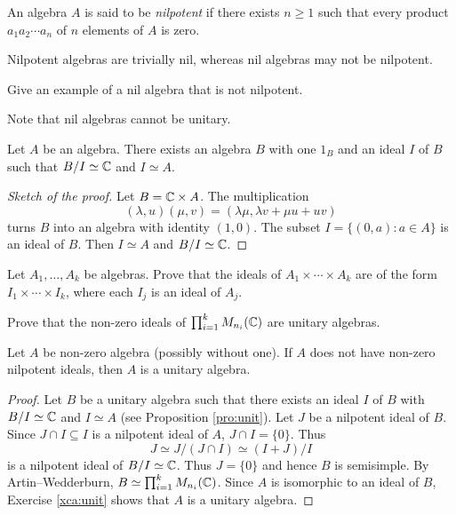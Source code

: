 \begin{definition}
    An algebra $A$ is said to be \emph{nilpotent} if there exists
    $n\geq1$ such that every product 
    $a_1a_2\cdots a_n$
    of $n$ elements of $A$ is zero. 
\end{definition}

Nilpotent algebras are trivially nil, whereas nil algebras may not be nilpotent.

\begin{exercise}
    Give an example of a nil algebra that is not nilpotent. 
\end{exercise}

Note that nil algebras cannot be unitary. 

\begin{proposition}
\label{pro:unit}
    Let $A$ be an algebra. There exists an algebra $B$ 
    with one $1_B$ and an ideal $I$ of $B$ 
    such that $B/I\simeq\mathbb{C}$ and $I\simeq A$. 
\end{proposition}

\begin{proof}[Sketch of the proof]
    Let $B=\mathbb{C}\times A$. The multiplication  
    \[
    (\lambda,u)(\mu,v)=(\lambda\mu,\lambda v+\mu u+uv)
    \]
    turns $B$ into an algebra with identity $(1,0)$. The subset
    $I=\{(0,a):a\in A\}$ is an ideal of $B$. Then $I\simeq A$ 
    and $B/I\simeq\mathbb{C}$. 
\end{proof}

\begin{exercise}
Let $A_1,\dots,A_k$ be algebras. 
Prove that the ideals of $A_1\times\cdots\times A_k$ 
are of the form $I_1\times\cdots\times I_k$, where
each $I_j$ is an ideal of $A_j$.  
\end{exercise}

\begin{exercise}
\label{xca:unit}
    Prove that the non-zero ideals of 
    $\prod_{i=1}^k M_{n_i}(\mathbb{C})$ are unitary algebras.  
\end{exercise}

\begin{proposition}
    Let $A$ be non-zero algebra (possibly without one). If $A$ 
    does not have non-zero nilpotent 
    ideals, then $A$ is a unitary algebra. 
\end{proposition}

\begin{proof}
    Let $B$ be a unitary algebra such that there exists
    an ideal $I$ of $B$ with $B/I\simeq\mathbb{C}$ and $I\simeq A$ 
    (see Proposition \ref{pro:unit}). Let $J$ be 
    a nilpotent ideal of $B$. Since $J\cap I\subseteq I$ is a nilpotent
    ideal of $A$, 
    $J\cap I=\{0\}$. Thus 
    \[
    J\simeq J/(J\cap I)\simeq (I+J)/I
    \]
    is a nilpotent ideal of $B/I\simeq\mathbb{C}$. Thus $J=\{0\}$ 
    and hence $B$ is semisimple. By Artin--Wedderburn, 
    $B\simeq\prod_{i=1}^k M_{n_i}(\mathbb{C})$. Since $A$ is isomorphic to an ideal of 
    $B$, Exercise \ref{xca:unit} shows
    that $A$ is a unitary algebra. 
\end{proof}

